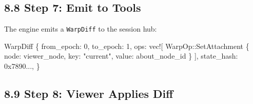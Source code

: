 \documentclass[
]{book}
\newenvironment{Shaded}{}{}
\newcommand{\DecValTok}[1]{\textcolor[rgb]{0.25,0.63,0.44}{#1}}
\newcommand{\NormalTok}[1]{#1}
\newcommand{\OperatorTok}[1]{\textcolor[rgb]{0.40,0.40,0.40}{#1}}
\newcommand{\PreprocessorTok}[1]{\textcolor[rgb]{0.74,0.48,0.00}{#1}}
\newcommand{\StringTok}[1]{\textcolor[rgb]{0.25,0.44,0.63}{#1}}
\begin{document}
\subsection{8.8 Step 7: Emit to Tools}\label{step-7-emit-to-tools}

The engine emits a \texttt{WarpDiff} to the session hub:

\begin{Shaded}
\begin{Highlighting}[]
\NormalTok{WarpDiff }\OperatorTok{\{}
\NormalTok{    from\_epoch}\OperatorTok{:} \DecValTok{0}\OperatorTok{,}
\NormalTok{    to\_epoch}\OperatorTok{:} \DecValTok{1}\OperatorTok{,}
\NormalTok{    ops}\OperatorTok{:} \PreprocessorTok{vec!}\NormalTok{[}
        \PreprocessorTok{WarpOp::}\NormalTok{SetAttachment }\OperatorTok{\{}
\NormalTok{            node}\OperatorTok{:}\NormalTok{ viewer\_node}\OperatorTok{,}
\NormalTok{            key}\OperatorTok{:} \StringTok{"current"}\OperatorTok{,}
\NormalTok{            value}\OperatorTok{:}\NormalTok{ about\_node\_id}
        \OperatorTok{\}}
\NormalTok{    ]}\OperatorTok{,}
\NormalTok{    state\_hash}\OperatorTok{:} \DecValTok{0x7890}\OperatorTok{...,}
\OperatorTok{\}}
\end{Highlighting}
\end{Shaded}

\subsection{8.9 Step 8: Viewer Applies
Diff}\label{step-8-viewer-applies-diff}
\end{document}
